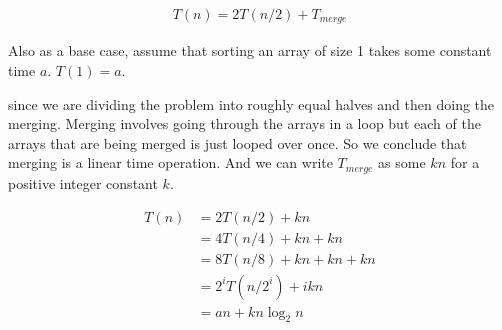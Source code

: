 \documentclass[12pt]{article}
\begin{document}
\begin{align*}
T(n) = 2T(n/2) + T_{merge}
\end{align*}

Also as a base case, assume that sorting an array of size 1 takes some constant time $a$. $T(1) = a$.

since we are dividing the problem into roughly equal halves and then doing the merging. Merging involves going through the arrays in a loop but each of the arrays that are being merged is just looped over once. So we conclude that merging is a linear time operation. And we can write $T_{merge}$ as some $kn$ for a positive integer constant $k$.

\begin{align*}
T(n) &= 2T(n/2) + kn \\
&= 4T(n/4) + kn + kn \\
&= 8T(n/8) + kn + kn + kn \\
&= 2^i T(n/2^i) + ikn\\
&= an + kn \log_2 n 
\end{align*}
\end{document}
